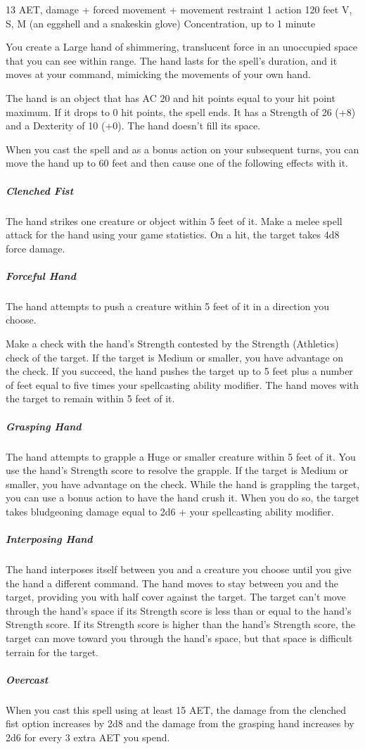 \label{spell:arcane-hand}
{13 AET, damage + forced movement + movement restraint}
{1 action}
{120 feet}
{V, S, M (an eggshell and a snakeskin glove)}
{Concentration, up to 1 minute}

You create a Large hand of shimmering, translucent force in an unoccupied space that you can see within range. The hand lasts for the spell's duration, and it moves at your command, mimicking the movements of your own hand.

The hand is an object that has AC 20 and hit points equal to your hit point maximum. If it drops to 0 hit points, the spell ends. It has a Strength of 26 (+8) and a Dexterity of 10 (+0). The hand doesn't fill its space.

When you cast the spell and as a bonus action on your subsequent turns, you can move the hand up to 60 feet and then cause one of the following effects with it.

\subparagraph*{Clenched Fist} The hand strikes one creature or object within 5 feet of it. Make a melee spell attack for the hand using your game statistics. On a hit, the target takes 4d8 force damage.

\subparagraph*{Forceful Hand} The hand attempts to push a creature within 5 feet of it in a direction you choose.

Make a check with the hand's Strength contested by the Strength (Athletics) check of the target. If the target is Medium or smaller, you have advantage on the check. If you succeed, the hand pushes the target up to 5 feet plus a number of feet equal to five times your spellcasting ability modifier. The hand moves with the target to remain within 5 feet of it.

\subparagraph*{Grasping Hand} The hand attempts to grapple a Huge or smaller creature within 5 feet of it. You use the hand's Strength score to resolve the grapple. If the target is Medium or smaller, you have advantage on the check. While the hand is grappling the target, you can use a bonus action to have the hand crush it. When you do so, the target takes bludgeoning damage equal to 2d6 + your spellcasting ability modifier.

\subparagraph*{Interposing Hand} The hand interposes itself between you and a creature you choose until you give the hand a different command. The hand moves to stay between you and the target, providing you with half cover against the target. The target can't move through the hand's space if its Strength score is less than or equal to the hand's Strength score. If its Strength score is higher than the hand's Strength score, the target can move toward you through the hand's space, but that space is difficult terrain for the target.

\subparagraph*{Overcast} When you cast this spell using at least 15 AET, the damage from the clenched fist option increases by 2d8 and the damage from the grasping hand increases by 2d6 for every 3 extra AET you spend.